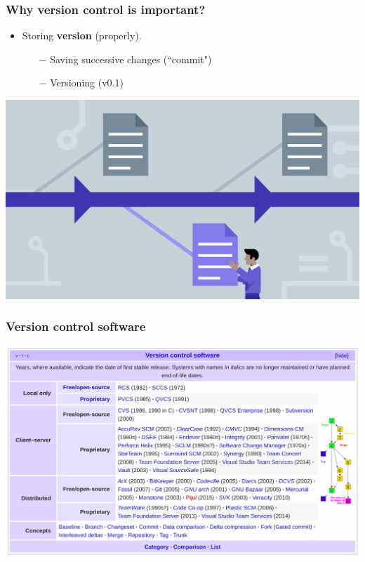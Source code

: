 \documentclass[svgnames]{beamer}
\begin{document}
\begin{frame}
\frametitle{Why version control is important?}
\begin{itemize}
    \item Storing \textbf{version} (properly). 
    \begin{itemize}
      \item [$-$] Saving successive changes (``commit")
      \item [$-$] Versioning (v0.1)
    \end{itemize}
\end{itemize}

\begin{center}
\includegraphics[scale=0.15]{img/storingVersion.jpg}
\end{center}

\end{frame}



\begin{frame}
    \frametitle{Version control software}
    \begin{center}
        \includegraphics[scale=0.29]{img/controlVersion.png}
    \end{center}
\end{frame}
\end{document}
